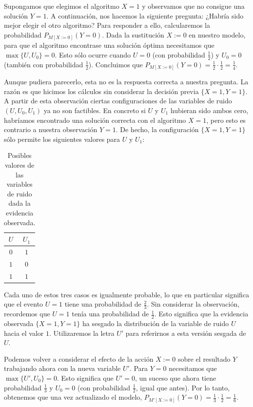 \documentclass[oneside,openright,titlepage,numbers=noenddot,openany,headinclude,footinclude=true,
cleardoublepage=empty,abstractoff,BCOR=5mm,paper=a4,fontsize=12pt,main=spanish]{scrreprt}
\begin{document}
Supongamos que elegimos el algoritmo $X = 1$ y observamos que no consigue una solución $Y = 1$. A continuación, nos hacemos la siguiente pregunta: ¿Habría sido mejor elegir el otro algoritmo? Para responder a ello, calcularemos la probabilidad $P_{M[X:=0]}(Y = 0)$. Dada la sustitución $X := 0$ en nuestro modelo, para que el algoritmo encontrase una solución óptima necesitamos que $\max\{U, U_0\} = 0$. Esto sólo ocurre cuando $U=0$ (con probabilidad $\frac{1}{2}$) y $U_0=0$ (también con probabilidad $\frac{1}{2}$). Concluimos que $P_{M[X:=0]}(Y = 0)=\frac{1}{2}\cdot \frac{1}{2}=\frac{1}{4}$.

Aunque pudiera parecerlo, esta no es la respuesta correcta a nuestra pregunta. La razón es que hicimos los cálculos sin considerar la decisión previa $\{X = 1, Y = 1\}$. A partir de esta observación ciertas configuraciones de las variables de ruido $(U, U_0, U_1)$ ya no son factibles. En concreto si $U$ y $U_1$ hubieran sido ambos cero, habríamos encontrado una solución correcta con el algoritmo $X = 1$, pero esto es contrario a nuestra observación $Y=1$. De hecho, la configuración $\{X = 1, Y = 1\}$ sólo permite los siguientes valores para $U$ y $U_1$:

\begin{table}[h]
\centering
\resizebox{2.0cm}{!} {
\begin{tabular}{cc}
\hline
$U$ & $U_1$ \\ \hline
$0$ & $1$   \\
$1$ & $0$   \\
$1$ & $1$   \\ \hline
\end{tabular}
}
\caption{Posibles valores de las variables de ruido dada la evidencia observada.}
\end{table}

Cada uno de estos tres casos es igualmente probable, lo que en particular significa que el evento $U = 1$ tiene una probabilidad de $\frac{2}{3}$. Sin considerar la observación, recordemos que $U = 1$ tenía una probabilidad de $\frac{1}{2}$. Esto significa que la evidencia observada $\{X = 1, Y = 1\}$ ha sesgado la distribución de la variable de ruido $U$ hacia el valor $1$. Utilizaremos la letra $U'$ para referirnos a esta versión sesgada de $U$.

Podemos volver a considerar el efecto de la acción $X := 0$ sobre el resultado $Y$ trabajando ahora con la nueva variable $U'$. Para $Y = 0$ necesitamos que $\max \{U', U_0\} = 0$. Esto significa que $U' = 0$, un suceso que ahora tiene probabilidad $\frac{1}{3}$ y $U_0 = 0$ (con probabilidad $\frac{1}{2}$, igual que antes). Por lo tanto, obtenemos que una vez actualizado el modelo, $P_{M'[X:=0]}(Y = 0)=\frac{1}{3}\cdot \frac{1}{2}=\frac{1}{6}$.
\end{document}
